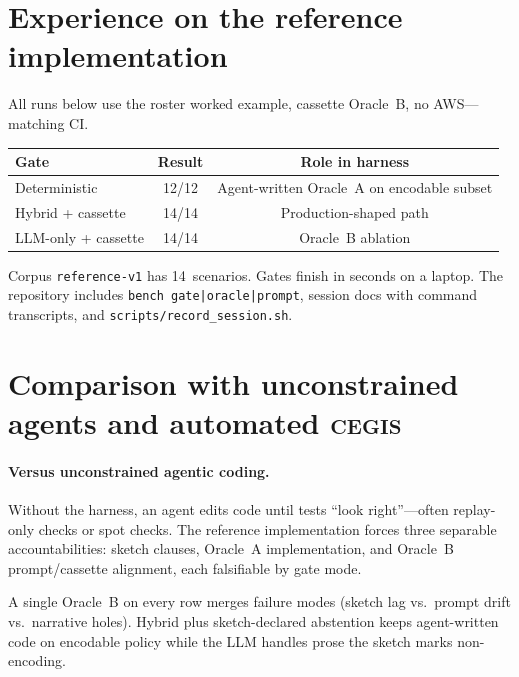 \documentclass[11pt]{article}
\begin{document}
\section{Experience on the reference implementation}
\label{sec:experience}

All runs below use the roster worked example, cassette Oracle~B, no AWS---matching CI.

\begin{center}
\begin{tabular}{lcc}
\hline
Gate & Result & Role in harness \\
\hline
Deterministic & 12/12 & Agent-written Oracle~A on encodable subset \\
Hybrid + cassette & 14/14 & Production-shaped path \\
LLM-only + cassette & 14/14 & Oracle~B ablation \\
\hline
\end{tabular}
\end{center}

Corpus \texttt{reference-v1} has 14~scenarios. Gates finish in seconds on a laptop.
The repository includes \texttt{bench gate|oracle|prompt}, session docs with command
transcripts, and \texttt{scripts/record\_session.sh}.

\section{Comparison with unconstrained agents and automated \textsc{cegis}}
\label{sec:comparison}

\paragraph{Versus unconstrained agentic coding.}
Without the harness, an agent edits code until tests ``look right''---often replay-only
checks or spot checks. The reference implementation forces three separable accountabilities: sketch
clauses, Oracle~A implementation, and Oracle~B prompt/cassette alignment, each
falsifiable by gate mode.

A single Oracle~B on every row merges failure modes (sketch lag vs.\ prompt drift vs.\
narrative holes). Hybrid plus sketch-declared abstention keeps agent-written code on
encodable policy while the LLM handles prose the sketch marks non-encoding.
\end{document}
